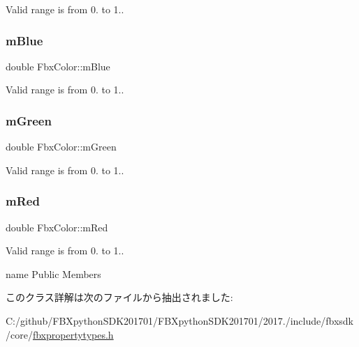 Valid range is from 0. to 1.. 

\mbox{\label{class_fbx_color_abf621ccd7dc31e50019c7bdde90dfe5e}} 
\subsubsection{\texorpdfstring{m\+Blue}{mBlue}}
{\footnotesize\ttfamily double Fbx\+Color\+::m\+Blue}



Valid range is from 0. to 1.. 

\mbox{\label{class_fbx_color_a43ba888941f635304a7ed885ccfed776}} 
\subsubsection{\texorpdfstring{m\+Green}{mGreen}}
{\footnotesize\ttfamily double Fbx\+Color\+::m\+Green}



Valid range is from 0. to 1.. 

\mbox{\label{class_fbx_color_aa58094c2415fa965bdf1e760892baa5c}} 
\subsubsection{\texorpdfstring{m\+Red}{mRed}}
{\footnotesize\ttfamily double Fbx\+Color\+::m\+Red}



Valid range is from 0. to 1.. 

name Public Members 

このクラス詳解は次のファイルから抽出されました\+:\begin{DoxyCompactItemize}
\item 
C\+:/github/\+F\+B\+Xpython\+S\+D\+K201701/\+F\+B\+Xpython\+S\+D\+K201701/2017./include/fbxsdk/core/\hyperlink{fbxpropertytypes_8h}{fbxpropertytypes.\+h}\end{DoxyCompactItemize}
